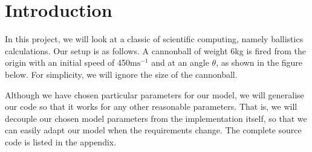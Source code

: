 \section{Introduction}

In this project, we will look at a classic of scientific computing, namely ballistics calculations. Our setup is as follows. A cannonball of weight 6kg is fired from the origin with an initial speed of 450m$\text{s}^{-1}$ and at an angle $\theta$, as shown in the figure below. For simplicity, we will ignore the size of the cannonball.



\noindent
Although we have chosen particular parameters for our model, we will generalise our code so that it works for any other reasonable parameters. That is, we will decouple our chosen model parameters from the implementation itself, so that we can easily adapt our model when the requirements change. The complete source code is listed in the appendix.